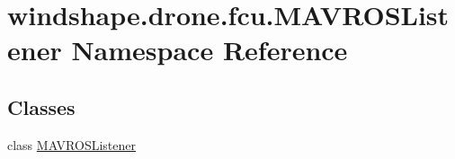 \hypertarget{namespacewindshape_1_1drone_1_1fcu_1_1_m_a_v_r_o_s_listener}{}\section{windshape.\+drone.\+fcu.\+M\+A\+V\+R\+O\+S\+Listener Namespace Reference}
\label{namespacewindshape_1_1drone_1_1fcu_1_1_m_a_v_r_o_s_listener}
\subsection*{Classes}
\begin{DoxyCompactItemize}
\item 
class \mbox{\hyperlink{classwindshape_1_1drone_1_1fcu_1_1_m_a_v_r_o_s_listener_1_1_m_a_v_r_o_s_listener}{M\+A\+V\+R\+O\+S\+Listener}}
\end{DoxyCompactItemize}
